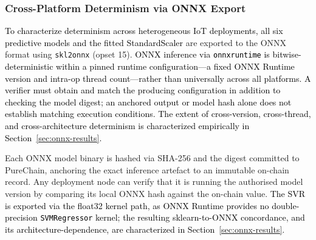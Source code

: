 \documentclass[conference]{IEEEtran}
\newcommand{\rev}[2]{#2}
\begin{document}
\subsubsection{Cross-Platform Determinism via ONNX Export}
\label{sec:onnx}

\textcolor{black}{To characterize determinism across heterogeneous IoT
deployments, all \rev{R2.1}{six predictive models and the fitted StandardScaler}} are exported to the ONNX format using
\texttt{skl2onnx} (opset 15).
\textcolor{black}{ONNX inference via \texttt{onnxruntime} is
bitwise-deterministic within a pinned runtime configuration---a
fixed ONNX Runtime version and intra-op thread count---rather
than universally across all platforms. \rev{R1.1}{A verifier must
obtain and match the producing configuration in addition to
checking the model digest; an anchored output or model hash
alone does not establish matching execution conditions.}
The extent of cross-version, cross-thread, and
cross-architecture determinism is characterized empirically
in Section~\ref{sec:onnx-results}.}

Each ONNX model binary is hashed via SHA-256 and the digest
committed to PureChain, anchoring the exact inference
artefact to an immutable on-chain record.
Any deployment node can verify that it is running the
authorised model version by comparing its local ONNX hash
against the on-chain value.
\textcolor{black}{The SVR is exported via the float32 kernel path,
as ONNX Runtime provides no double-precision \texttt{SVMRegressor}
kernel; the resulting sklearn-to-ONNX concordance, and its
architecture-dependence, are characterized in
Section~\ref{sec:onnx-results}.}
\end{document}
